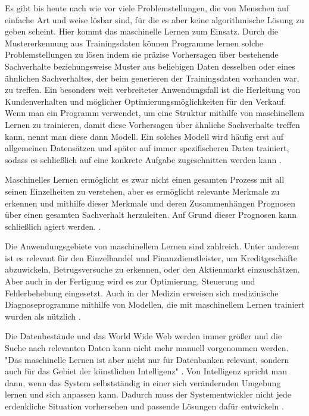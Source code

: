Es gibt bis heute nach wie vor viele Problemstellungen, die von Menschen auf einfache Art und weise lösbar sind, für die es aber keine algorithmische Lösung zu geben scheint. Hier kommt das maschinelle Lernen zum Einsatz. Durch die Mustererkennung aus Trainingsdaten können Programme lernen solche Problemstellungen zu lösen indem sie präzise Vorhersagen über bestehende Sachverhalte beziehungsweise Muster aus beliebigen Daten desselben oder eines ähnlichen Sachverhaltes, der beim generieren der Trainingsdaten vorhanden war, zu treffen. Ein besonders weit verbreiteter Anwendungsfall ist die Herleitung von Kundenverhalten und möglicher Optimierungsmöglichkeiten für den Verkauf. Wenn man ein Programm verwendet, um eine Struktur mithilfe von maschinellem Lernen zu trainieren, damit diese Vorhersagen über ähnliche Sachverhalte treffen kann, nennt man diese dann Modell. Ein solches Modell wird häufig erst auf allgemeinen Datensätzen und später auf immer spezifischeren Daten trainiert, sodass es schließlich auf eine konkrete Aufgabe zugeschnitten werden kann \cite[Seite 1f]{alpaydin_maschinelles_2022}.

Maschinelles Lernen ermöglicht es zwar nicht einen gesamten Prozess mit all seinen Einzelheiten zu verstehen, aber es ermöglicht relevante Merkmale zu erkennen und mithilfe dieser Merkmale und deren Zusammenhängen Prognosen über einen gesamten Sachverhalt herzuleiten. Auf Grund dieser Prognosen kann schließlich agiert werden. \cite[Seite 2]{alpaydin_maschinelles_2022}.

Die Anwendungsgebiete von maschinellem Lernen sind zahlreich. Unter anderem ist es relevant für den Einzelhandel und Finanzdienstleister, um Kreditgeschäfte abzuwickeln, Betrugsversuche zu erkennen, oder den Aktienmarkt einzuschätzen. Aber auch in der Fertigung wird es zur Optimierung, Steuerung und Fehlerbehebung eingesetzt. Auch in der Medizin erweisen sich medizinische Diagnoseprogramme mithilfe von Modellen, die mit maschinellem Lernen trainiert wurden als nützlich \cite[Seite 3]{alpaydin_maschinelles_2022}.

Die Datenbestände und das World Wide Web werden immer größer und die Suche nach relevanten Daten kann nicht mehr manuell vorgenommen werden. "Das maschinelle Lernen ist aber nicht nur für Datenbanken relevant, sondern auch für das Gebiet der künstlichen Intelligenz" \cite[Seite 3]{alpaydin_maschinelles_2022}. Von Intelligenz spricht man dann, wenn das System selbstständig in einer sich verändernden Umgebung lernen und sich anpassen kann. Dadurch muss der Systementwickler nicht jede erdenkliche Situation vorhersehen und passende Lösungen dafür entwickeln \cite[Seite 3]{alpaydin_maschinelles_2022}.
 
